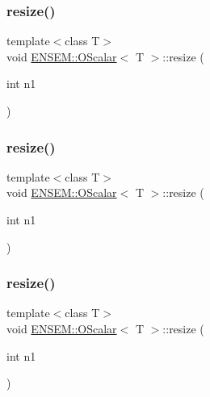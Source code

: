 \mbox{\label{classENSEM_1_1OScalar_ab8b1ad6566b12cb3036794b47bb0ae8d}} 
\subsubsection{\texorpdfstring{resize()}{resize()}\hspace{0.1cm}{\footnotesize\ttfamily [4/6]}}
{\footnotesize\ttfamily template$<$class T$>$ \\
void \mbox{\hyperlink{classENSEM_1_1OScalar}{E\+N\+S\+E\+M\+::\+O\+Scalar}}$<$ T $>$\+::resize (\begin{DoxyParamCaption}\item[{int}]{n1 }\end{DoxyParamCaption})\hspace{0.3cm}{\ttfamily [inline]}}

\mbox{\label{classENSEM_1_1OScalar_ab8b1ad6566b12cb3036794b47bb0ae8d}} 
\subsubsection{\texorpdfstring{resize()}{resize()}\hspace{0.1cm}{\footnotesize\ttfamily [5/6]}}
{\footnotesize\ttfamily template$<$class T$>$ \\
void \mbox{\hyperlink{classENSEM_1_1OScalar}{E\+N\+S\+E\+M\+::\+O\+Scalar}}$<$ T $>$\+::resize (\begin{DoxyParamCaption}\item[{int}]{n1 }\end{DoxyParamCaption})\hspace{0.3cm}{\ttfamily [inline]}}

\mbox{\label{classENSEM_1_1OScalar_ab8b1ad6566b12cb3036794b47bb0ae8d}} 
\subsubsection{\texorpdfstring{resize()}{resize()}\hspace{0.1cm}{\footnotesize\ttfamily [6/6]}}
{\footnotesize\ttfamily template$<$class T$>$ \\
void \mbox{\hyperlink{classENSEM_1_1OScalar}{E\+N\+S\+E\+M\+::\+O\+Scalar}}$<$ T $>$\+::resize (\begin{DoxyParamCaption}\item[{int}]{n1 }\end{DoxyParamCaption})\hspace{0.3cm}{\ttfamily [inline]}}

